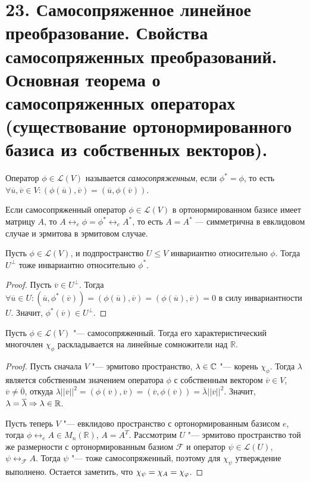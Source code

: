\section{23. Самосопряженное линейное преобразование. Свойства самосопряженных преобразований. Основная теорема о самосопряженных операторах (существование ортонормированного базиса из собственных векторов).}

\begin{definition}
	Оператор $\phi \in \mathcal{L}(V)$ называется \textit{самосопряженным}, если $\phi^* = \phi$, то есть $\forall \overline{u}, \overline{v} \in V: (\phi(\overline{u}), \overline{v}) = (\overline{u}, \phi(\overline{v}))$.
\end{definition}

\begin{note}
	Если самосопряженный оператор $\phi \in \mathcal{L}(V)$ в ортонормированном базисе имеет матрицу $A$, то $A \leftrightarrow_e \phi = \phi^* \leftrightarrow_e A^*$, то есть $A = A^*$ --- симметрична в евклидовом случае и эрмитова в эрмитовом случае.
\end{note}

\begin{proposition}
	Пусть $\phi \in \mathcal{L}(V)$, и подпространство $U \le V$ инвариантно относительно $\phi$. Тогда $U^\perp$ тоже инвариантно относительно $\phi^*$.
\end{proposition}

\begin{proof}
	Пусть $\overline{v} \in U^\perp$. Тогда $\forall \overline{u} \in U: (\overline{u}, \phi^*(\overline{v})) = (\phi(\overline{u}), \overline{v}) = (\phi(\overline{u}), \overline{v}) = 0$ в силу инвариантности $U$. Значит, $\phi^*(\overline{v}) \in U^\perp$.
\end{proof}

\begin{proposition}
	Пусть $\phi \in \mathcal{L}(V)$ "--- самосопряженный. Тогда его характеристический многочлен $\chi_\phi$ раскладывается на линейные сомножители над $\mathbb{R}$.
\end{proposition}

\begin{proof}
	Пусть сначала $V$ "--- эрмитово пространство, $\lambda \in \mathbb{C}$ "--- корень $\chi_\phi$. Тогда $\lambda$ является собственным значением оператора $\phi$ с собственным вектором $\overline{v} \in V$, $\overline{v} \ne \overline{0}$, откуда $\lambda||\overline{v}||^2 = (\phi(\overline{v}), \overline{v}) = (\overline{v}, \phi(\overline{v})) = \overline{\lambda}||\overline{v}||^2$. Значит, $\lambda = \overline\lambda \Rightarrow \lambda \in \mathbb{R}$.
	
	Пусть теперь $V$ "--- евклидово пространство с ортонормированным базисом $e$, тогда $\phi \leftrightarrow_e A \in M_n(\mathbb{R})$, $A = A^T$. Рассмотрим $U$ "--- эрмитово пространство той же размерности с ортонормированным базиом $\mathcal{F}$ и оператор $\psi \in \mathcal{L}(U)$, $\psi \leftrightarrow_{\mathcal{F}} A$. Тогда $\psi$ "--- тоже самосопряженный, поэтому для $\chi_\psi$ утверждение выполнено. Остается заметить, что $\chi_\psi \hm{=} \chi_A = \chi_\phi$.
\end{proof}

